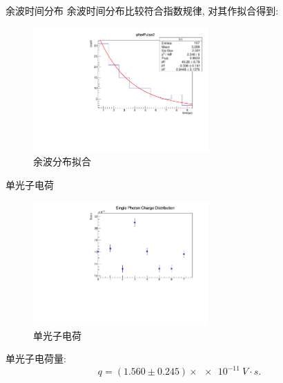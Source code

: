 \documentclass[10pt]{beamer}
\begin{document}
\begin{frame}[label={sec:orge7ea5e6}]{余波时间分布}
余波时间分布比较符合指数规律, 对其作拟合得到:

\begin{figure}[htbp]
\centering
\includegraphics[width=0.6\textwidth]{../../DetectorPerform/afterPulse/fig/afterPulse02r.pdf}
\caption{余波分布拟合}
\end{figure}
\end{frame}

\begin{frame}[label={sec:orgf598c09}]{单光子电荷}
\begin{figure}[htbp]
\centering
\includegraphics[width=0.6\textwidth]{../../DetectorPerform/SPhoton/SphotonCharge.pdf}
\caption{单光子电荷}
\end{figure}

单光子电荷量:
\begin{equation}
\label{eq:6}
q = (1.560 \pm 0.245)\times\qty{e-11}{V\cdot s}.
\end{equation}
\end{frame}
\end{document}
